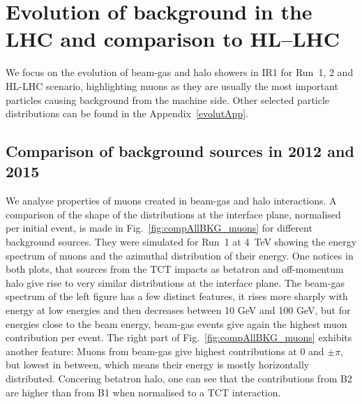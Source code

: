 \newpage
\section{Evolution of background in the LHC and comparison to HL--LHC\label{evolut}}

We focus on the evolution of beam-gas and halo showers in IR1 for Run~1, 2 and HL-LHC scenario, highlighting muons as they are usually the most important particles causing background from the machine side. Other selected particle distributions can be found in the Appendix~\ref{evolutApp}.

\subsection{Comparison of background sources in 2012 and 2015}

We analyse properties of muons created in beam-gas and halo interactions. A comparison of the shape of the distributions at the interface plane, normalised per initial event, is made in Fig.~\ref{fig:compAllBKG_muons} for different background sources. They were simulated for Run~1 at 4~TeV showing the energy spectrum of muons and the azimuthal distribution of their energy. One notices in both plots, that sources from the TCT impacts as betatron and off-momentum halo give rise to very similar distributions at the interface plane. The beam-gas spectrum of the left figure has a few distinct features, it rises more sharply with energy at low energies and then decreases between 10 GeV and 100 GeV, but for energies close to the beam energy, beam-gas events give again the highest muon contribution per event. The right part of Fig.~\ref{fig:compAllBKG_muons} exhibits another feature: Muons from beam-gas give highest contributions at $0$ and $\pm \pi$, but lowest in between, which means their energy is mostly horizontally distributed. Concering betatron halo, one can see that the contributions from B2 are higher than from B1 when normalised to a TCT interaction.\\

